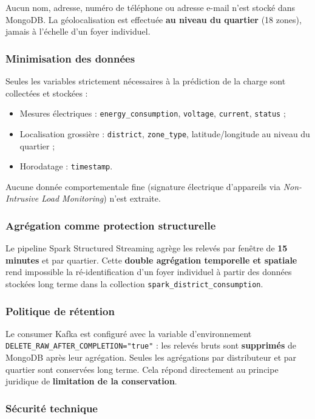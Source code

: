 \documentclass[11pt,a4paper]{article}
\begin{document}
Aucun nom, adresse, numéro de téléphone ou adresse e-mail n'est stocké dans MongoDB. La géolocalisation est effectuée \textbf{au niveau du quartier} (18 zones), jamais à l'échelle d'un foyer individuel.

\subsubsection{Minimisation des données}
Seules les variables strictement nécessaires à la prédiction de la charge sont collectées et stockées :
\begin{itemize}
  \item Mesures électriques : \texttt{energy\_consumption}, \texttt{voltage}, \texttt{current}, \texttt{status} ;
  \item Localisation grossière : \texttt{district}, \texttt{zone\_type}, latitude/longitude au niveau du quartier ;
  \item Horodatage : \texttt{timestamp}.
\end{itemize}
Aucune donnée comportementale fine (signature électrique d'appareils via \emph{Non-Intrusive Load Monitoring}) n'est extraite.

\subsubsection{Agrégation comme protection structurelle}
Le pipeline Spark Structured Streaming agrège les relevés par fenêtre de \textbf{15 minutes} et par quartier. Cette \textbf{double agrégation temporelle et spatiale} rend impossible la ré-identification d'un foyer individuel à partir des données stockées long terme dans la collection \texttt{spark\_district\_consumption}.

\subsubsection{Politique de rétention}
Le consumer Kafka est configuré avec la variable d'environnement \texttt{DELETE\_RAW\_AFTER\_COMPLETION="true"} : les relevés bruts sont \textbf{supprimés} de MongoDB après leur agrégation. Seules les agrégations par distributeur et par quartier sont conservées long terme. Cela répond directement au principe juridique de \textbf{limitation de la conservation}.

\subsubsection{Sécurité technique}
\end{document}
